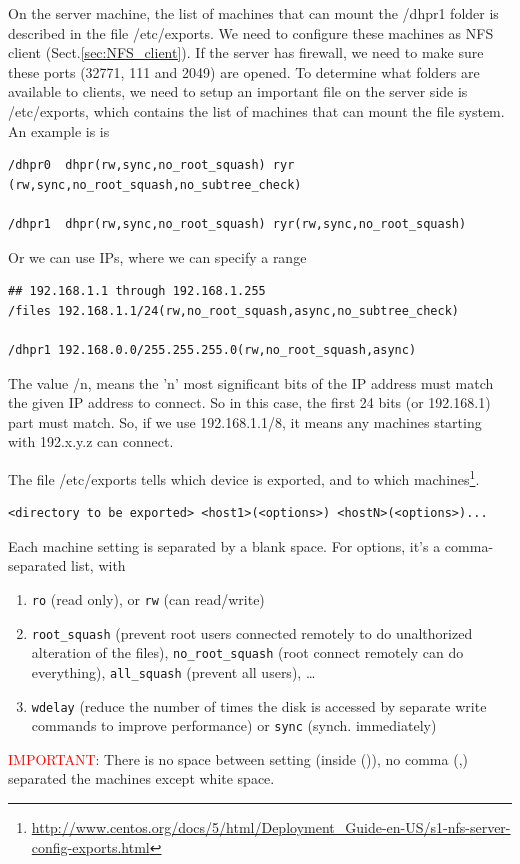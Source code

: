 On the server machine, the list of machines that can mount the /dhpr1 folder is
described in the file /etc/exports. We need to configure these machines as NFS
client (Sect.\ref{sec:NFS_client}). If the server has firewall, we need to make
sure these ports (32771, 111 and 2049) are opened. To determine what folders are
available to clients, we need to setup an important file on the server side is
/etc/exports, which contains the list of machines that can mount the file
system. An example is is 
{\small
\begin{verbatim}
/dhpr0  dhpr(rw,sync,no_root_squash) ryr (rw,sync,no_root_squash,no_subtree_check) 

/dhpr1  dhpr(rw,sync,no_root_squash) ryr(rw,sync,no_root_squash)
\end{verbatim}
}
Or we can use IPs, where we can specify a range
\begin{verbatim}
## 192.168.1.1 through 192.168.1.255 
/files 192.168.1.1/24(rw,no_root_squash,async,no_subtree_check)

/dhpr1 192.168.0.0/255.255.255.0(rw,no_root_squash,async)
\end{verbatim}
The value /n, means the 'n' most significant bits of the IP address must match
the given IP address to connect. So in this case, the first 24 bits (or
192.168.1) part must match. So, if we use 192.168.1.1/8, it means any machines
starting with 192.x.y.z can connect.

\begin{framed}

The file /etc/exports tells which device is exported, and to which
machines\footnote{\url{http://www.centos.org/docs/5/html/Deployment_Guide-en-US/s1-nfs-server-config-exports.html}}.
{\small 
\begin{verbatim}
<directory to be exported> <host1>(<options>) <hostN>(<options>)...
\end{verbatim}
}

Each machine setting is separated by a blank space. For options, it's a
comma-separated list, with
\begin{enumerate}
  \item \verb!ro! (read only), or \verb!rw! (can read/write)
  \item \verb!root_squash! (prevent root users connected remotely to do
  unalthorized alteration of the files), \verb!no_root_squash! (root connect
  remotely can do everything), \verb!all_squash! (prevent all users), \ldots
  \item \verb!wdelay! (reduce the number of times the disk is accessed by
  separate write commands to improve performance) or \verb!sync! (synch.
  immediately)
\end{enumerate}
\textcolor{red}{IMPORTANT}: There is no space between setting (inside ()), no
comma (,) separated the machines except white space. 
\end{framed}

